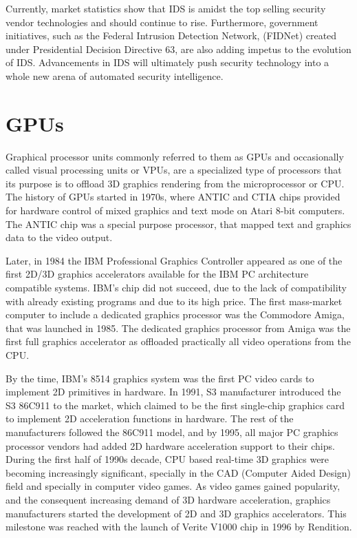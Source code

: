 \documentclass[thesis=M,english]{FITthesis}[2011/07/15]
\begin{document}
Currently, market statistics show that IDS is amidst the top selling security vendor technologies and should continue to rise. Furthermore, government initiatives, such as the Federal Intrusion Detection Network, (FIDNet) created under Presidential Decision Directive 63, are also adding impetus to the evolution of IDS. Advancements in IDS will ultimately push security technology into a whole new arena of automated security intelligence.

\section{GPUs}
Graphical processor units commonly referred to them as GPUs and occasionally called visual processing units or VPUs, are a specialized type of processors that its purpose is to offload 3D graphics rendering from the microprocessor or CPU. The history of GPUs started in 1970s, where ANTIC and CTIA chips provided for hardware control of mixed graphics and text mode on Atari 8-bit computers. The ANTIC chip was a special purpose processor, that mapped text and graphics data to the video output.

Later, in 1984 the IBM Professional Graphics Controller appeared as one of the first 2D/3D graphics accelerators available for the IBM PC architecture compatible systems. IBM’s chip did not succeed, due to the lack of compatibility with already existing programs and due to its high price. The first mass-market computer to include a dedicated graphics processor was the Commodore Amiga, that was launched in 1985. The dedicated graphics processor from Amiga was the first full graphics accelerator as offloaded practically all video operations from the CPU.

By the time, IBM’s 8514 graphics system was the first PC video cards to implement 2D primitives in hardware. In 1991, S3 manufacturer introduced the S3 86C911 to the market, which claimed to be the first single-chip graphics card to implement 2D acceleration functions in hardware. The rest of the manufacturers followed the 86C911 model, and by 1995, all major PC graphics processor vendors had added 2D hardware acceleration support to their chips. During the first half of 1990s decade, CPU based real-time 3D graphics were becoming increasingly significant, specially in the CAD (Computer Aided Design) field and specially in computer video games. As video games gained popularity, and the consequent increasing demand of 3D hardware acceleration, graphics manufacturers started the development of 2D and 3D graphics accelerators. This milestone was reached with the launch of Verite V1000 chip in 1996 by Rendition.
\end{document}
